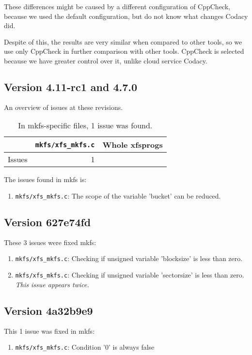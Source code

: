 These differences might be caused by a different configuration of CppCheck,
because we used the default configuration, but do not know what changes
Codacy did.

Despite of this, the results are very similar when compared to other tools,
so we use only CppCheck in further comparison with other tools. CppCheck is
selected because we have greater control over it, unlike cloud service Codacy.


\subsection{Version 4.11-rc1 and 4.7.0}
An overview of issues at these revisions.
\begin{table}[h]
\begin{tabular}{|l||r||r|}
\hline
& {\tt mkfs/xfs\_mkfs.c} & Whole xfsprogs \\
\hline
Issues & 1 &  \\
\hline
\end{tabular}
\caption{In mkfs-specific files, 1 issue was found.}
\end{table}

The issues found in mkfs is:
\begin{enumerate}
	\item {\tt mkfs/xfs\_mkfs.c}: The scope of the variable 'bucket' can be reduced.
\end{enumerate}

\subsection{Version 627e74fd}
These 3 issues were fixed mkfs:
\begin{enumerate}
	\item {\tt mkfs/xfs\_mkfs.c}: Checking if unsigned variable 'blocksize' is less than zero.
	\item {\tt mkfs/xfs\_mkfs.c}: Checking if unsigned variable
		'sectorsize' is less than zero. {\em This issue appears
		twice.}
\end{enumerate}


\subsection{Version 4a32b9e9}
This 1 issue was fixed in mkfs:
\begin{enumerate}
	\item {\tt mkfs/xfs\_mkfs.c}: Condition '0' is always false
\end{enumerate}


